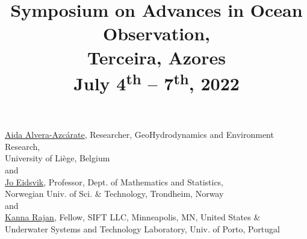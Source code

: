 \documentclass[12pt,letterpaper]{article}
\title{Symposium on Advances in Ocean Observation,\\
  Terceira, Azores\\
  \large{\textbf{July 4\textsuperscript{th} -- 7\textsuperscript{th},
      2022}}}
\date{}
\begin{document}
\maketitle{}

\vspace{-1.75cm}
\begin{center}
   \href{http://modb.oce.ulg.ac.be/mediawiki/index.php/User:Aida}{\textsf{Aida Alvera-Azc\'{a}rate}},
  Researcher, GeoHydrodynamics and Environment Research,\\
  University of Li\`{e}ge, Belgium\\
  and\\
  \href{https://www.ntnu.edu/employees/jo.eidsvik}{\textsf{Jo Eidsvik}},
  Professor, Dept. of Mathematics and Statistics, \\Norwegian Univ. of
  Sci. \& Technology, Trondheim, Norway\\
  and\\
  \href{https://kanna.rajan.systems}{\textsf{Kanna Rajan}},
  Fellow, SIFT LLC, Minneapolis, MN, United States \& \\Underwater Systems and Technology
  Laboratory, Univ. of Porto, Portugal\\
\end{center}








\renewcommand{\thepage}{}
\end{document}
